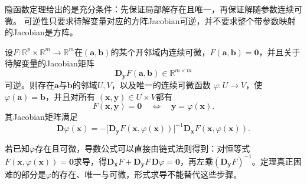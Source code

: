 隐函数定理给出的是充分条件：先保证局部解存在且唯一，再保证解随参数连续可微。
可逆性只要求待解变量对应的方阵Jacobian可逆，并不要求整个带参数映射的Jacobian是方阵。
\begin{theorem}[隐函数定理]
\label{thm:analysis-implicit-function}
设$F:\mathbb{R}^p\times\mathbb{R}^m\to\mathbb{R}^m$在$(\bm{a},\bm{b})$的某个开邻域内连续可微，$F(\bm{a},\bm{b})=\bm{0}$，并且关于待解变量的Jacobian矩阵
\[
 \bm{D}_{\bm{y}}F(\bm{a},\bm{b})\in\mathbb{R}^{m\times m}
\]
可逆。则存在$\bm{a}$与$\bm{b}$的邻域$U,V$，以及唯一的连续可微函数
$\varphi:U\to V$，使$\varphi(\bm{a})=\bm{b}$，并且对所有
$(\bm{x},\bm{y})\in U\times V$都有
\[
  F(\bm{x},\bm{y})=\bm{0}
  \quad\Longleftrightarrow\quad
  \bm{y}=\varphi(\bm{x}).
\]
其Jacobian矩阵满足
\begin{equation}
  \bm{D}\varphi(\bm{x})
  =
  -
  \bigl[\bm{D}_{\bm{y}}F(\bm{x},\varphi(\bm{x}))\bigr]^{-1}
  \bm{D}_{\bm{x}}F(\bm{x},\varphi(\bm{x})).
\label{eq:analysis-implicit-derivative}
\end{equation}
\end{theorem}
若已知$\varphi$存在且可微，导数公式可以直接由链式法则得到：对恒等式$F(\bm x,\varphi(\bm x))=\bm 0$求导，得$\bm D_{\bm x}F+\bm D_{\bm y}F\,\bm D\varphi=\bm 0$，再左乘$(\bm D_{\bm y}F)^{-1}$。定理真正困难的部分是$\varphi$的存在、唯一与可微，形式求导不能替代这些步骤。

